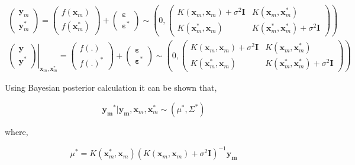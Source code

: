 \documentclass[english]{tktltiki}
\begin{document}
\begin{eqnarray}
\begin{pmatrix}
\mathbf{y}_m \\
\mathbf{y}_m^*
\end{pmatrix}
= %
\begin{pmatrix}
f(\mathbf{x}_m) \\
f(\mathbf{x}_m^*)
\end{pmatrix}
+%
\begin{pmatrix}
\mathbf{\varepsilon} \\
\mathbf{\varepsilon^*}
\end{pmatrix}
\sim \left( %
0, %
\begin{pmatrix}
K(\mathbf{x}_m, \mathbf{x}_m) + \sigma^2 \mathbf{I} & K(\mathbf{x}_m, \mathbf{x}_m^*) \\
K(\mathbf{x}_m^*, \mathbf{x}_m) & K(\mathbf{x}_m^*, \mathbf{x}_m^*) + \sigma^2 \mathbf{I}
\end{pmatrix}\right) \nonumber \\
\left.
\begin{pmatrix}
\mathbf{y} \\
\mathbf{y}^*
\end{pmatrix}
\right\vert_{\mathbf{x}_m, \mathbf{x}_m^*}
= %
\begin{pmatrix}
f(.) \\
f(.)^*
\end{pmatrix}
+%
\begin{pmatrix}
\mathbf{\varepsilon} \\
\mathbf{\varepsilon^*}
\end{pmatrix}
\sim \left( %
0, %
\begin{pmatrix}
K(\mathbf{x}_m, \mathbf{x}_m) + \sigma^2 \mathbf{I} & K(\mathbf{x}_m, \mathbf{x}_m^*) \\
K(\mathbf{x}_m^*, \mathbf{x}_m) & K(\mathbf{x}_m^*, \mathbf{x}_m^*) + \sigma^2 \mathbf{I}
\end{pmatrix}\right)
\end{eqnarray}

Using Bayesian posterior calculation it can be shown that,

\begin{equation}
\mathbf{y_m}^* | \mathbf{y_m}, \mathbf{x}_m, \mathbf{x}_m^* \sim (\mu^*, \Sigma^*)
\end{equation}

where,

\begin{equation}
\mu^* = K(\mathbf{x}_m^*, \mathbf{x}_m)(K(\mathbf{x}_m, \mathbf{x}_m) + \sigma^2 \mathbf{I})^{-1}\mathbf{y_m}
\end{equation}
\end{document}
